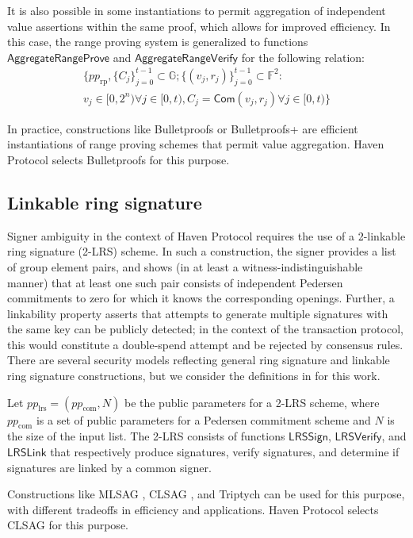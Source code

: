 \documentclass{article}
\newcommand{\G}{\mathbb{G}}
\newcommand{\F}{\mathbb{F}}
\newcommand{\func}[1]{\mathsf{#1}}
\newcommand{\com}{\func{Com}}
\begin{document}
It is also possible in some instantiations to permit aggregation of independent value assertions within the same proof, which allows for improved efficiency.
In this case, the range proving system is generalized to functions $\func{AggregateRangeProve}$ and $\func{AggregateRangeVerify}$ for the following relation:
\begin{multline*}
\{pp_{\text{rp}}, \{C_j\}_{j=0}^{t-1} \subset \G ; \{(v_j, r_j)\}_{j=0}^{t-1} \subset \F^2 : \\
v_j \in [0,2^n) \forall j \in [0,t), C_j = \com(v_j,r_j) \forall j \in [0,t)\}
\end{multline*}

In practice, constructions like Bulletproofs \cite{bp} or Bulletproofs+ \cite{bpplus} are efficient instantiations of range proving schemes that permit value aggregation.
Haven Protocol selects Bulletproofs for this purpose.

\subsection{Linkable ring signature}

Signer ambiguity in the context of Haven Protocol requires the use of a 2-linkable ring signature (2-LRS) scheme.
In such a construction, the signer provides a list of group element pairs, and shows (in at least a witness-indistinguishable manner) that at least one such pair consists of independent Pedersen commitments to zero for which it knows the corresponding openings.
Further, a linkability property asserts that attempts to generate multiple signatures with the same key can be publicly detected; in the context of the transaction protocol, this would constitute a double-spend attempt and be rejected by consensus rules.
There are several security models reflecting general ring signature and linkable ring signature constructions, but we consider the definitions in \cite{clsag} for this work.

Let $pp_{\text{lrs}} = (pp_{\text{com}},N)$ be the public parameters for a 2-LRS scheme, where $pp_{\text{com}}$ is a set of public parameters for a Pedersen commitment scheme and $N$ is the size of the input list.
The 2-LRS consists of functions $\func{LRSSign}$, $\func{LRSVerify}$, and $\func{LRSLink}$ that respectively produce signatures, verify signatures, and determine if signatures are linked by a common signer.

Constructions like MLSAG \cite{ringct}, CLSAG \cite{clsag}, and Triptych \cite{triptych} can be used for this purpose, with different tradeoffs in efficiency and applications.
Haven Protocol selects CLSAG for this purpose.
\end{document}
